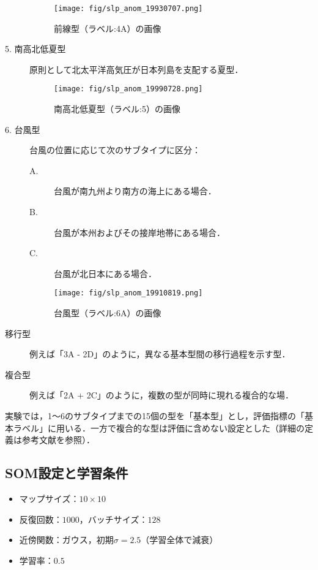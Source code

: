 \documentclass{jarticle}
\theoremstyle{definition}
\begin{document}
\begin{description}
\begin{figure}[H] \centering \texttt{[image: fig/slp\_anom\_19930707.png]} \caption{前線型（ラベル:4A）の画像} \label{fig:slp_anom_19930707} \end{figure}

\item[5. 南高北低夏型] 原則として北太平洋高気圧が日本列島を支配する夏型．

\begin{figure}[H] \centering \texttt{[image: fig/slp\_anom\_19990728.png]} \caption{南高北低夏型（ラベル:5）の画像} \label{fig:slp_anom_19990728} \end{figure}

\item[6. 台風型] 台風の位置に応じて次のサブタイプに区分：
  \begin{description}
    \item[A.] 台風が南九州より南方の海上にある場合．
    \item[B.] 台風が本州およびその接岸地帯にある場合．
    \item[C.] 台風が北日本にある場合．
  \end{description}

\begin{figure}[H] \centering \texttt{[image: fig/slp\_anom\_19910819.png]} \caption{台風型（ラベル:6A）の画像} \label{fig:slp_anom_19910819} \end{figure}
  
\item[移行型] 例えば「3A - 2D」のように，異なる基本型間の移行過程を示す型．
\item[複合型] 例えば「2A + 2C」のように，複数の型が同時に現れる複合的な場．
\end{description}

実験では，1〜6のサブタイプまでの15個の型を「基本型」とし，評価指標の「基本ラベル」に用いる．一方で複合的な型は評価に含めない設定とした（詳細の定義は参考文献\cite{吉野2002日本の気候}を参照）．

\subsection{SOM設定と学習条件}
\begin{itemize}
\item マップサイズ：$10\times 10$
\item 反復回数：$1000$，バッチサイズ：$128$
\item 近傍関数：ガウス，初期$\sigma=2.5$（学習全体で減衰）
\item 学習率：$0.5$
\end{itemize}
\end{document}
